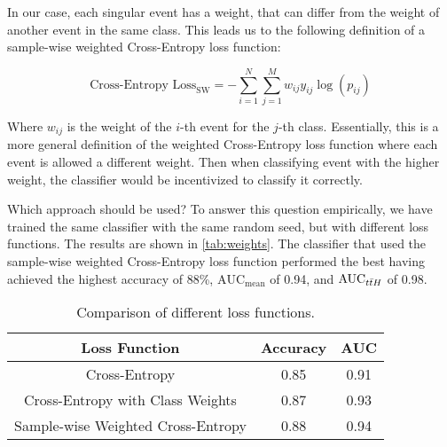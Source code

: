 In our case, each singular event has a weight, that can differ from the weight of another event in the same class. This
leads us to the following definition of a sample-wise weighted Cross-Entropy loss function:

$$
    \text{Cross-Entropy Loss}_\text{SW} = -\sum_{i=1}^{N} \sum_{j=1}^{M} w_{ij} y_{ij} \log(p_{ij})
$$

Where $w_{ij}$ is the weight of the $i$-th event for the $j$-th class. Essentially, this is a more general definition of
the weighted Cross-Entropy loss function where each event is allowed a different weight. Then when classifying event
with the higher weight, the classifier would be incentivized to classify it correctly.

Which approach should be used? To answer this question empirically, we have trained the same classifier with the same
random seed, but with different loss functions. The results are shown in \autoref{tab:weights}. The classifier
that used the sample-wise weighted Cross-Entropy loss function performed the best having achieved the highest accuracy
of 88\%, $\text{AUC}_\text{mean}$ of 0.94, and $\text{AUC}_{t\bar{t}H}$ of 0.98.

\begin{table}[htbp]
    \centering
    \begin{tabular}{ccc}
        \toprule
        Loss Function                      & Accuracy & AUC  \\
        \midrule
        Cross-Entropy                      & 0.85     & 0.91 \\
        Cross-Entropy with Class Weights   & 0.87     & 0.93 \\
        Sample-wise Weighted Cross-Entropy & 0.88     & 0.94 \\
        \bottomrule
    \end{tabular}
    \caption{Comparison of different loss functions.}
    \label{tab:weights}
\end{table}
